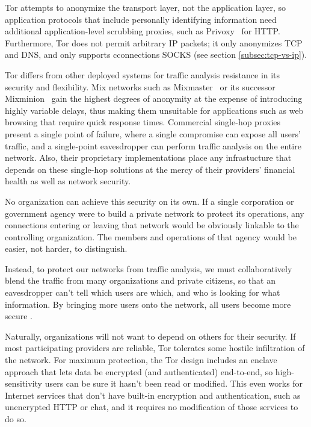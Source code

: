\documentclass{llncs}
\begin{document}
Tor attempts to anonymize the transport layer, not the application layer, so
application protocols that include personally identifying information need
additional application-level scrubbing proxies, such as
Privoxy~\cite{privoxy} for HTTP.  Furthermore, Tor does not permit arbitrary
IP packets; it only anonymizes TCP and DNS, and only supports cconnections
SOCKS (see section \ref{subsec:tcp-vs-ip}).

Tor differs from other deployed systems for traffic analysis resistance
in its security and flexibility.  Mix networks such as
Mixmaster~\cite{mixmaster} or its successor Mixminion~\cite{minion-design}
gain the highest degrees of anonymity at the expense of introducing highly
variable delays, thus making them unsuitable for applications such as web
browsing that require quick response times.  Commercial single-hop
proxies~\cite{anonymizer} present a single point of failure, where
a single compromise can expose all users' traffic, and a single-point
eavesdropper can perform traffic analysis on the entire network.
Also, their proprietary implementations place any infrastucture that
depends on these single-hop solutions at the mercy of their providers'
financial health as well as network security.

No organization can achieve this security on its own.  If a single
corporation or government agency were to build a private network to
protect its operations, any connections entering or leaving that network
would be obviously linkable to the controlling organization.  The members
and operations of that agency would be easier, not harder, to distinguish.

Instead, to protect our networks from traffic analysis, we must
collaboratively blend the traffic from many organizations and private
citizens, so that an eavesdropper can't tell which users are which,
and who is looking for what information.  By bringing more users onto
the network, all users become more secure \cite{econymics}.

Naturally, organizations will not want to depend on others for their
security.  If most participating providers are reliable, Tor tolerates
some hostile infiltration of the network.  For maximum protection,
the Tor design includes an enclave approach that lets data be encrypted
(and authenticated) end-to-end, so high-sensitivity users can be sure it
hasn't been read or modified.  This even works for Internet services that
don't have built-in encryption and authentication, such as unencrypted
HTTP or chat, and it requires no modification of those services to do so.
\end{document}
